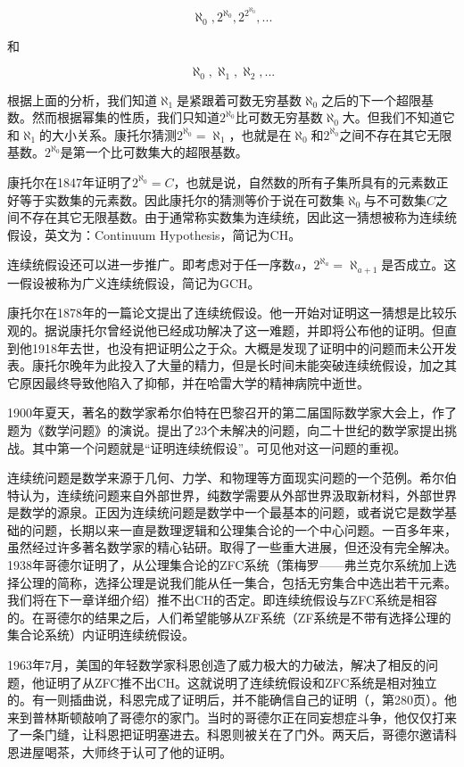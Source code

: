 \documentclass{article}
\begin{document}
\[
\aleph_0, 2^{\aleph_0}, 2^{2^{\aleph_0}}, ...
\]

和

\[
\aleph_0, \aleph_1, \aleph_2, ...
\]

根据上面的分析，我们知道$\aleph_1$是紧跟着可数无穷基数$\aleph_0$之后的下一个超限基数。然而根据幂集的性质，我们只知道$2^{\aleph_0}$比可数无穷基数$\aleph_0$大。但我们不知道它和$\aleph_1$的大小关系。康托尔猜测$2^{\aleph_0} = \aleph_1$，也就是在$\aleph_0$和$2^{\aleph_0}$之间不存在其它无限基数。$2^{\aleph_0}$是第一个比可数集大的超限基数。

康托尔在1847年证明了$2^{\aleph_0} = C$，也就是说，自然数的所有子集所具有的元素数正好等于实数集的元素数。因此康托尔的猜测等价于说在可数集$\aleph_0$与不可数集$C$之间不存在其它无限基数。由于通常称实数集为连续统，因此这一猜想被称为连续统假设，英文为：Continuum Hypothesis，简记为CH。

连续统假设还可以进一步推广。即考虑对于任一序数$a$，$2^{\aleph_a} = \aleph_{a+1}$是否成立。这一假设被称为广义连续统假设，简记为GCH。

康托尔在1878年的一篇论文提出了连续统假设。他一开始对证明这一猜想是比较乐观的。据说康托尔曾经说他已经成功解决了这一难题，并即将公布他的证明。但直到他1918年去世，也没有把证明公之于众。大概是发现了证明中的问题而未公开发表。康托尔晚年为此投入了大量的精力，但是长时间未能突破连续统假设，加之其它原因最终导致他陷入了抑郁，并在哈雷大学的精神病院中逝世。

1900年夏天，著名的数学家希尔伯特在巴黎召开的第二届国际数学家大会上，作了题为《数学问题》的演说。提出了23个未解决的问题，向二十世纪的数学家提出挑战。其中第一个问题就是“证明连续统假设”。可见他对这一问题的重视。

连续统问题是数学来源于几何、力学、和物理等方面现实问题的一个范例。希尔伯特认为，连续统问题来自外部世界，纯数学需要从外部世界汲取新材料，外部世界是数学的源泉。正因为连续统问题是数学中一个最基本的问题，或者说它是数学基础的问题，长期以来一直是数理逻辑和公理集合论的一个中心问题。一百多年来，虽然经过许多著名数学家的精心钻研。取得了一些重大进展，但还没有完全解决。1938年哥德尔证明了，从公理集合论的ZFC系统（策梅罗——弗兰克尔系统加上选择公理的简称，选择公理是说我们能从任一集合，包括无穷集合中选出若干元素。我们将在下一章详细介绍）推不出CH的否定。即连续统假设与ZFC系统是相容的。在哥德尔的结果之后，人们希望能够从ZF系统（ZF系统是不带有选择公理的集合论系统）内证明连续统假设。

1963年7月，美国的年轻数学家科恩创造了威力极大的力破法，解决了相反的问题，他证明了从ZFC推不出CH。这就说明了连续统假设和ZFC系统是相对独立的。有一则插曲说，科恩完成了证明后，并不能确信自己的证明（\cite{HanXueTao16}，第280页）。他来到普林斯顿敲响了哥德尔的家门。当时的哥德尔正在同妄想症斗争，他仅仅打来了一条门缝，让科恩把证明塞进去。科恩则被关在了门外。两天后，哥德尔邀请科恩进屋喝茶，大师终于认可了他的证明。
\end{document}
